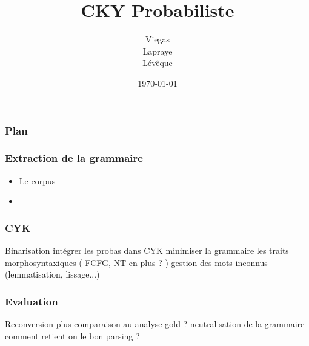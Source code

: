 \documentclass{beamer}
\begin{document}
\title{CKY Probabiliste}  %
\author{Viegas\\Lapraye\\Lévêque}

\date{\today}


\begin{frame}
 \maketitle
\end{frame}



\begin{frame} %
\frametitle{Plan}
\end{frame}

\begin{frame}
\frametitle{Extraction de la grammaire}

\begin{itemize}
 \item<1-3> Le corpus
 \item<2-3> 
\end{itemize}

 
\end{frame}

\begin{frame}
 \frametitle{CYK}
 Binarisation 
 intégrer les probas dans CYK
 minimiser la grammaire
 les traits morphosyntaxiques ( FCFG, NT en plus ? )
 gestion des mots inconnus (lemmatisation, lissage...)
 
\end{frame}

\begin{frame}
\frametitle{Evaluation}
 Reconversion plus comparaison au analyse gold
? neutralisation de la grammaire
comment retient on le bon parsing ?
\end{frame}





%
%
%
%
%
%
\end{document}
